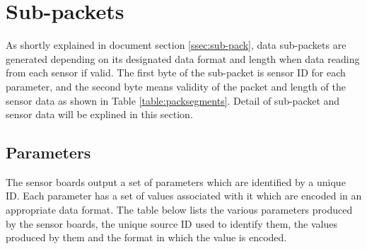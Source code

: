 \newpage
\section{Sub-packets}

As shortly explained in document section \ref{ssec:sub-pack}, data sub-packets are generated depending on its designated data format and length when data reading from each sensor if valid. The first byte of the sub-packet is sensor ID for each parameter, and the second byte means validity of the packet and length of the sensor data as shown in Table \ref{table:packsegments}. Detail of sub-packet and sensor data will be explined in this section.


\subsection{Parameters}

The sensor boards output a set of parameters which are identified by a unique ID. Each parameter
has a set of values associated with it which are encoded in an appropriate data format. The table
below lists the various parameters produced by the sensor boards, the unique source ID used to identify them, the values produced by them and the format in which the value is encoded.


